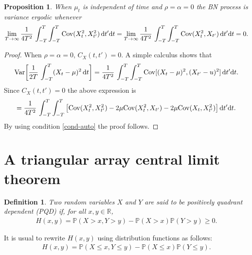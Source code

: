 \documentclass[12pt]{article}
\newtheorem{proposition}[theorem]{Proposition}
\newtheorem{definition}[theorem]{Definition}
\theoremstyle{definition}
\begin{document}
\begin{proposition}
When $\mu_t$ is independent of time and $\rho=\alpha=0$ the BN process is variance ergodic whenever
\begin{align}\label{cond-auto}
\lim_{T\to\infty} 
{1\over 4T^2}\,
\int_{-T}^{T} \int_{-T}^{T} {\rm Cov}(X_t^2,X_{t'}^2)\, {\rm d} t' {\rm d} t
=
\lim_{T\to\infty} 
{1\over 4T^2}\,
\int_{-T}^{T} \int_{-T}^{T} {\rm Cov}(X_t^2,X_{t'})\, {\rm d} t' {\rm d} t
=0.
\end{align}
\end{proposition}
\begin{proof}
When $\rho=\alpha=0$, $C_X(t,t')=0$. A simple calculus shows that
\begin{align*}
	{\rm Var}\biggl[
{1\over 2T}\, \int_{-T}^{T} (X_t-\mu)^2\, {\rm d} t
\biggr]
=
{1\over 4T^2}\,
\int_{-T}^{T} \int_{-T}^{T} {\rm Cov}[(X_t-\mu)^2,(X_{t'}-u)^2]\, {\rm d} t' {\rm d} t.
\end{align*}
Since $C_X(t,t')=0$ the above expression is
\begin{align*}
=
{1\over 4T^2}\,
\int_{-T}^{T} \int_{-T}^{T} 
\big[{\rm Cov}(X_t^2,X_{t'}^2)-2\mu{\rm Cov}(X_t^2,X_{t'})-2\mu{\rm Cov}(X_t,X_{t'}^2)\big] \, {\rm d} t' {\rm d} t.
\end{align*}
By using condition \eqref{cond-auto} the proof follows.
\end{proof}

\section{A triangular array central limit theorem}\label{sec:triangular}


\begin{definition}
Two random variables $X$ and $Y$ are said to be positively quadrant
dependent (PQD) if, for all $x,y\in\mathbb{R}$,
\begin{align*}
H(x,y)=\mathbb{P}(X>x,Y>y)-\mathbb{P}(X>x)\mathbb{P}(Y>y)\geq 0.
\end{align*}
\end{definition}
It is usual to rewrite $H(x,y)$ using distribution
functions as follows:
\begin{align}\label{ident-H}
H(x,y)=\mathbb{P}(X\leq x,Y\leq y)-\mathbb{P}(X\leq x)\mathbb{P}(Y\leq y).
\end{align}
\end{document}
